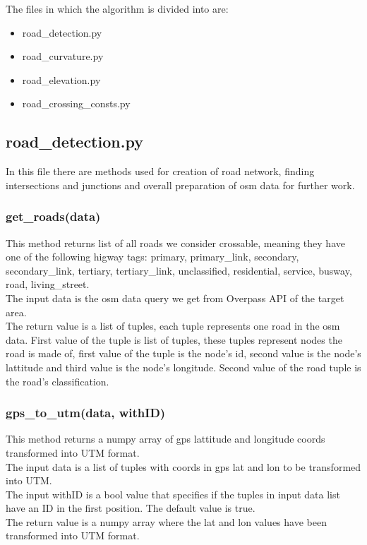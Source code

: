\documentclass[oneside]{article}
\begin{document}
    \noindent The files in which the algorithm is divided into are:
    \begin{itemize}
        \item road\_detection.py
        \item road\_curvature.py
        \item road\_elevation.py
        \item road\_crossing\_consts.py
    \end{itemize}

        \subsection{road\_detection.py}
        In this file there are methods used for creation of road network, finding intersections and junctions and overall preparation of osm data for further work.

            \subsubsection{get\_roads(data)}
            This method returns list of all roads we consider crossable, meaning they have one of the following higway tags: primary, primary\_link, secondary, secondary\_link, tertiary, tertiary\_link, unclassified, residential, service, busway, road, living\_street.\\
            The input data is the osm data query we get from Overpass API of the target area.\\
            The return value is a list of tuples, each tuple represents one road in the osm data. First value of the tuple is list of tuples, these tuples represent nodes the road is made of, first value of the tuple is the node's id, second value is the node's lattitude and third value is the node's longitude. Second value of the road tuple is the road's classification.

            \subsubsection{gps\_to\_utm(data, withID)}
            This method returns a numpy array of gps lattitude and longitude coords transformed into UTM format.\\
            The input data is a list of tuples with coords in gps lat and lon to be transformed into UTM.\\
            The input withID is a bool value that specifies if the tuples in input data list have an ID in the first position. The default value is true.\\
            The return value is a numpy array where the lat and lon values have been transformed into UTM format.
\end{document}
